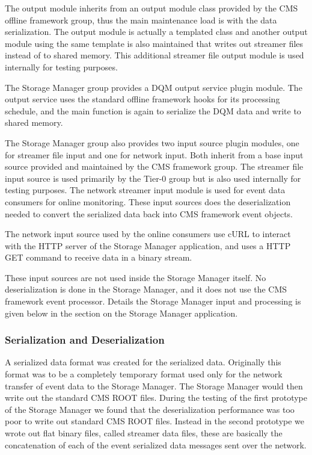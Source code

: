 The output module inherits from an output module class provided by the CMS
offline framework group, thus the main maintenance load is with the data
serialization. The output module is actually a templated class and another
output module using the same template is also maintained that writes out
streamer files instead of to shared memory. This additional streamer file
output module is used internally for testing purposes.

The Storage Manager group provides a DQM output service plugin module.
The output service uses the standard offline framework hooks for its
processing schedule, and the main function is again to serialize the
DQM data and write to shared memory.

The Storage Manager group also provides two input source plugin modules,
one for streamer file input and one for network input. Both inherit from
a base input source provided and maintained by the CMS framework group.
The streamer file input source is used primarily by the Tier-0 group
but is also used internally for testing purposes. The network streamer input
module is used for event data consumers for online monitoring.
These input sources does the deserialization needed to convert the serialized
data back into CMS framework event objects.

The network input source used by the online consumers use cURL to
interact with the HTTP server of the Storage Manager application, and uses a 
HTTP GET command to receive data in a binary stream.

These input sources are not used inside the Storage Manager itself.
No deserialization is done in the Storage Manager, and it does not
use the CMS framework event processor. Details the Storage Manager input
and processing is given below in the section on the Storage Manager
application.


\subsubsection{Serialization and Deserialization}

A serialized data format was created for the serialized data. Originally this
format was to be a completely temporary format used only for the network
transfer of event data to the Storage Manager. The Storage Manager would then
write out the standard CMS ROOT files. During the testing of the first prototype
of the Storage Manager we found that the deserialization performance was too
poor to write out standard CMS ROOT files. Instead in the second prototype
we wrote out flat binary files, called streamer data files, these are basically
the concatenation of each of the event serialized data messages
sent over the network.

